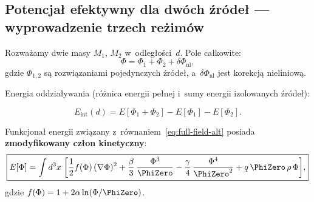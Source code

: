 \subsection{Potencja\l{} efektywny dla dw\'och \'zr\'ode\l{}
  --- wyprowadzenie trzech re\.zim\'ow}\label{ssec:dwa-zrodla}

Rozwa\.zamy dwie masy $M_1$, $M_2$ w~odleg\l{}o\'sci~$d$.
Pole ca\l{}kowite:
\begin{equation}
  \Phi = \Phi_1 + \Phi_2 + \delta\Phi_{\mathrm{nl}},
\end{equation}
gdzie $\Phi_{1,2}$ s\k{a} rozwi\k{a}zaniami pojedynczych \'zr\'ode\l{},
a~$\delta\Phi_{\mathrm{nl}}$ jest korekcj\k{a} nieliniow\k{a}.

Energia oddzia\l{}ywania (r\'o\.znica energii pe\l{}nej i~sumy
energii izolowanych \'zr\'ode\l{}):

\begin{equation}\label{eq:Eint}
  E_{\mathrm{int}}(d) = E[\Phi_1+\Phi_2] - E[\Phi_1] - E[\Phi_2].
\end{equation}

Funkcjona\l{} energii zwi\k{a}zany z~r\'ownaniem~\eqref{eq:full-field-alt}
posiada \textbf{zmodyfikowany cz\l{}on kinetyczny}:
\begin{equation}\label{eq:energy-corrected}
  \boxed{
    E[\Phi] = \int d^3x\;\biggl[
      \frac{1}{2}f(\Phi)\,(\nabla\Phi)^2
      + \frac{\beta}{3}\,\frac{\Phi^3}{\PhiZero}
      - \frac{\gamma}{4}\,\frac{\Phi^4}{\PhiZero^2}
      + q\,\PhiZero\,\rho\,\Phi
    \biggr],
  }
\end{equation}
gdzie $f(\Phi) = 1 + 2\alpha\ln(\Phi/\PhiZero)$.

